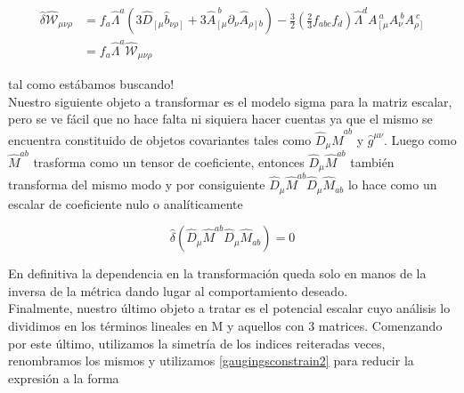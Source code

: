 \documentclass{article}
\numberwithin{equation}{section}
\begin{document}
\begin{equation}
\begin{aligned}
\hat{\delta} \hat{\mathcal{W}}_{\mu \nu \rho} &= f_a \hat{\Lambda}^a \left( 3\hat{D}_{\left[ \mu \right.} \hat{b}_{\left. \nu \rho \right]} +3 \hat{A}_{\left[\mu\right.}^{\ b} \partial_{\nu} \hat{A}_{\left.\rho\right] b}\right) - \frac{3}{2} \left( \frac{2}{3} f_{a b c}f_d \right) \hat{\Lambda}^d A_{\left[\mu\right.}^{\ a} A_{\nu}^{\ b} A_{\left.\rho\right]}^{\ c}\\
&= f_a \hat{\Lambda}^a \hat{\mathcal{W}}_{\mu \nu \rho}
\end{aligned}
\end{equation}

tal como estábamos buscando!\\

Nuestro siguiente objeto a transformar es el modelo sigma para la matriz escalar, pero se ve fácil que no hace falta ni siquiera hacer cuentas ya que el mismo se encuentra constituido de objetos covariantes tales como $\hat{D}_{\mu} \hat{M}^{a b}$ y  $ \hat{g}^{\mu \nu} $. Luego como $ \hat{M}^{a b} $ trasforma como un tensor de coeficiente, entonces $ \hat{D}_{\mu} \hat{M}^{a b} $ también transforma del mismo modo y por consiguiente $ \hat{D}_{\mu} \hat{M}^{a b} \hat{D}_{\mu} \hat{M}_{a b} $ lo hace como un escalar de coeficiente nulo o analíticamente

\begin{equation}
\hat{\delta} \left(\hat{D}_{\mu} \hat{M}^{a b} \hat{D}_{\mu} \hat{M}_{a b} \right) = 0
\end{equation}

En definitiva la dependencia en la transformación queda solo en manos de la inversa de la métrica dando lugar al comportamiento deseado.\\

Finalmente, nuestro último objeto a tratar es el potencial escalar cuyo análisis lo dividimos en los términos lineales en M y aquellos con 3 matrices. Comenzando por este último, utilizamos la simetría de los indices reiteradas veces, renombramos los mismos  y utilizamos \ref{gaugingsconstrain2} para reducir la expresión a la forma
\end{document}
